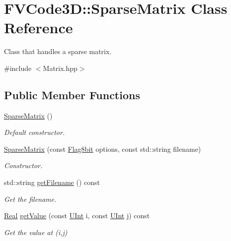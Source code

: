 \hypertarget{classFVCode3D_1_1SparseMatrix}{}\section{F\+V\+Code3D\+:\+:Sparse\+Matrix Class Reference}
\label{classFVCode3D_1_1SparseMatrix}


Class that handles a sparse matrix.  




{\ttfamily \#include $<$Matrix.\+hpp$>$}

\subsection*{Public Member Functions}
\begin{DoxyCompactItemize}
\item 
\hyperlink{classFVCode3D_1_1SparseMatrix_a2f72653e42581403405df3559264f4b4}{Sparse\+Matrix} ()
\begin{DoxyCompactList}\small\item\em Default constructor. \end{DoxyCompactList}\item 
\hyperlink{classFVCode3D_1_1SparseMatrix_a7961e085c9e55f2520110910c8aad990}{Sparse\+Matrix} (const \hyperlink{namespaceFVCode3D_a4eac36ed1d93d886ecdcf46c6386b415}{Flag8bit} options, const std\+::string filename)
\begin{DoxyCompactList}\small\item\em Constructor. \end{DoxyCompactList}\item 
std\+::string \hyperlink{classFVCode3D_1_1SparseMatrix_a84f73b0f731b6b47b4c6be70c6d312a7}{get\+Filename} () const 
\begin{DoxyCompactList}\small\item\em Get the filename. \end{DoxyCompactList}\item 
\hyperlink{namespaceFVCode3D_a40c1f5588a248569d80aa5f867080e83}{Real} \hyperlink{classFVCode3D_1_1SparseMatrix_a7cf40c4af2ad22d73fc31f3685e48b93}{get\+Value} (const \hyperlink{namespaceFVCode3D_a4bf7e328c75d0fd504050d040ebe9eda}{U\+Int} i, const \hyperlink{namespaceFVCode3D_a4bf7e328c75d0fd504050d040ebe9eda}{U\+Int} j) const 
\begin{DoxyCompactList}\small\item\em Get the value at (i,j) \end{DoxyCompactList}\item 

\end{DoxyCompactItemize}
